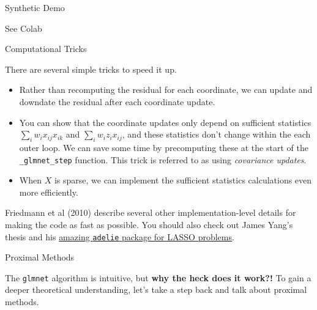 \documentclass[aspectratio=169]{beamer}
\begin{document}
\begin{frame}[t,allowframebreaks]{Synthetic Demo}\label{synthetic-demo-2}

\begin{center}
    See Colab
\end{center}
\end{frame}

\begin{frame}[t,allowframebreaks]{Computational Tricks}\label{computational-tricks}

There are several simple tricks to speed it up. 

\begin{itemize}
    \item Rather than recomputing the residual for each
coordinate, we can update and downdate the residual after each
coordinate update. 

    \item You can show that the coordinate updates only
depend on sufficient statistics \(\sum_{i} w_i x_{ij} x_{ik}\) and
\(\sum_i w_i z_i x_{ij}\), and these statistics don't change within the
each outer loop. We can save some time by precomputing these at the
start of the \texttt{\_glmnet\_step} function. This trick is referred to
as using \emph{covariance updates}. 

    \item When \(X\) is sparse, we can
implement the sufficient statistics calculations even more efficiently.
\end{itemize}

Friedmann et al (2010) describe several other
implementation-level details for making the code as fast as possible.
You should also check out James Yang's thesis and his
\href{https://github.com/JamesYang007/adelie}{amazing \texttt{adelie}
package for LASSO problems}.
\end{frame}

\begin{frame}[t,allowframebreaks]{Proximal Methods}\label{proximal-methods}

The \texttt{glmnet} algorithm is intuitive, but \textbf{why the heck
does it work?!} To gain a deeper theoretical understanding, let's take a
step back and talk about proximal methods.
\end{frame}
\end{document}
